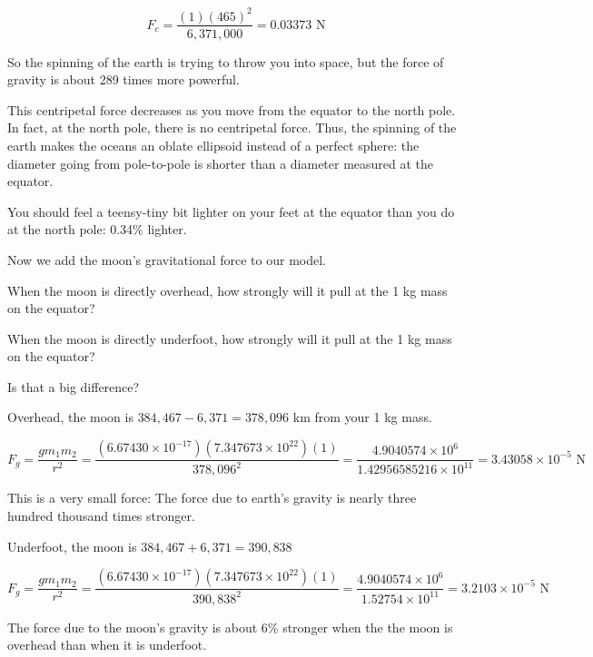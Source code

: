\begin{Answer}[ref=life-orbits2]

$$F_c = \frac{(1) (465)^2}{6,371,000}  = 0.03373 \text{ N}$$

So the spinning of the earth is trying to throw you into space,  but the force of gravity is about 289 times more powerful.

This centripetal force decreases as you move from the equator to the north pole.   In fact, at the north pole, 
there is no centripetal force.   Thus, the spinning of the earth makes the oceans an oblate ellipsoid instead of a perfect sphere: the diameter going from pole-to-pole is shorter than a diameter measured at the equator.

You should feel a teensy-tiny bit lighter on your feet at the equator than you do at the north pole: 0.34\% lighter.

\end{Answer}

\begin{Exercise}[title={Life Among the Orbits 3: The Moon's Gravity}, label=life-orbits3]

Now we add the moon's gravitational force to our model.

When the moon is directly overhead,   how strongly will it pull at the 1 kg mass on the equator?

When the moon is directly underfoot,  how strongly will it pull at the 1 kg mass on the equator?

Is that a big difference?

\end{Exercise}

\begin{Answer}[ref=life-orbits3]

Overhead, the moon is $384,467 - 6,371 = 378,096$ km from your 1 kg mass.

$$F_g =  \frac{g m_1 m_2}{r^2} = \frac{\left( 6.67430 \times 10^{-17} \right) \left( 7.347673 \times 10^{22} \right) \left(1\right)}{378,096^2} =  
\frac{4.9040574 \times 10^{6}}{1.42956585216 \times 10^{11}}  = 3.43058 \times 10^{-5} \text{ N}$$

This is a very small force: The force due to earth's gravity is nearly three hundred thousand times stronger.

Underfoot, the moon is $384,467 + 6,371 = 390,838$

$$F_g =  \frac{g m_1 m_2}{r^2} = \frac{\left( 6.67430 \times 10^{-17} \right) \left( 7.347673 \times 10^{22} \right) \left(1\right)}{390,838^2} =  \frac{4.9040574 \times 10^{6}}{1.52754 \times 10^{11}} =  3.2103 \times 10^{-5} \text{ N}$$

The force due to the moon's gravity is about 6\% stronger when the the moon is overhead than when it is underfoot. 

\end{Answer}


